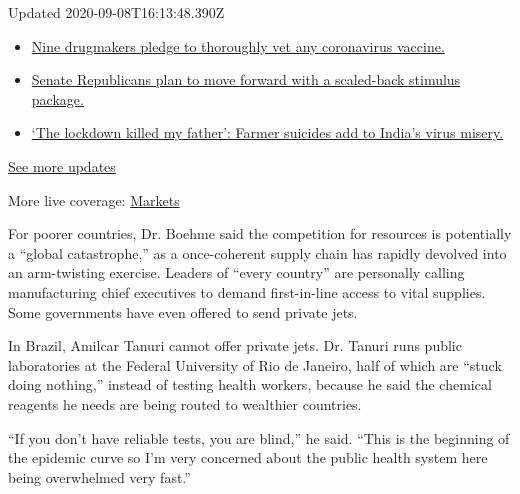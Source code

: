 Updated 2020-09-08T16:13:48.390Z

\begin{itemize}
\tightlist
\item
  \href{https://www.nytimes3xbfgragh.onion/2020/09/08/world/covid-19-coronavirus.html?action=click\&pgtype=Article\&state=default\&region=MAIN_CONTENT_1\&context=storylines_live_updates\#link-679303d7}{Nine
  drugmakers pledge to thoroughly vet any coronavirus vaccine.}
\item
  \href{https://www.nytimes3xbfgragh.onion/2020/09/08/world/covid-19-coronavirus.html?action=click\&pgtype=Article\&state=default\&region=MAIN_CONTENT_1\&context=storylines_live_updates\#link-547feae1}{Senate
  Republicans plan to move forward with a scaled-back stimulus package.}
\item
  \href{https://www.nytimes3xbfgragh.onion/2020/09/08/world/covid-19-coronavirus.html?action=click\&pgtype=Article\&state=default\&region=MAIN_CONTENT_1\&context=storylines_live_updates\#link-1c973131}{`The
  lockdown killed my father': Farmer suicides add to India's virus
  misery.}
\end{itemize}

\href{https://www.nytimes3xbfgragh.onion/2020/09/08/world/covid-19-coronavirus.html?action=click\&pgtype=Article\&state=default\&region=MAIN_CONTENT_1\&context=storylines_live_updates}{See
more updates}

More live coverage:
\href{https://www.nytimes3xbfgragh.onion/live/2020/09/08/business/stock-market-today-coronavirus?action=click\&pgtype=Article\&state=default\&region=MAIN_CONTENT_1\&context=storylines_live_updates}{Markets}

For poorer countries, Dr. Boehme said the competition for resources is
potentially a ``global catastrophe,'' as a once-coherent supply chain
has rapidly devolved into an arm-twisting exercise. Leaders of ``every
country'' are personally calling manufacturing chief executives to
demand first-in-line access to vital supplies. Some governments have
even offered to send private jets.

In Brazil, Amilcar Tanuri cannot offer private jets. Dr. Tanuri runs
public laboratories at the Federal University of Rio de Janeiro, half of
which are ``stuck doing nothing,'' instead of testing health workers,
because he said the chemical reagents he needs are being routed to
wealthier countries.

``If you don't have reliable tests, you are blind,'' he said. ``This is
the beginning of the epidemic curve so I'm very concerned about the
public health system here being overwhelmed very fast.''

